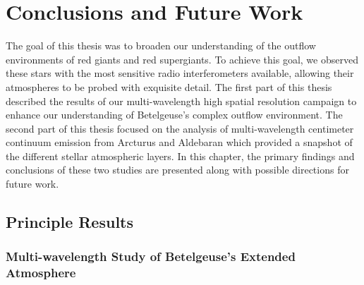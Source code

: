 \chapter{Conclusions and Future Work}
\label{chap:8}

The goal of this thesis was to broaden our understanding of the outflow environments of red giants and red supergiants. To achieve this goal, we observed these stars with the most sensitive radio interferometers available, allowing their atmospheres to be probed with exquisite detail. The first part of this thesis described the results of our multi-wavelength high spatial resolution campaign to enhance our understanding of Betelgeuse's complex outflow environment. The second part of this thesis focused on the analysis of multi-wavelength centimeter continuum emission from Arcturus and Aldebaran which provided a snapshot of the different stellar atmospheric layers. In this chapter, the primary findings and conclusions of these two studies are presented along with possible directions for future work.

\pagebreak

\section{Principle Results}\label{sec:8.1}
\subsection{Multi-wavelength Study of Betelgeuse's Extended Atmosphere}\label{sec:8.1.1}

